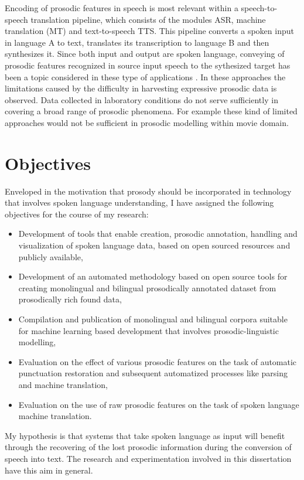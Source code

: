 Encoding of prosodic features in speech is most relevant within a speech-to-speech translation pipeline, which consists of the modules ASR, machine translation (MT) and text-to-speech TTS. This pipeline converts a spoken input in language A to text, translates its transcription to language B and then synthesizes it. Since both input and output are spoken language, conveying of prosodic features recognized in source input speech to the sythesized target has been a topic considered in these type of applications \citep{aguero2006prosody, Quoc2018}. In these approaches the limitations caused by the difficulty in harvesting expressive prosodic data is observed. Data collected in laboratory conditions do not serve sufficiently in covering a broad range of prosodic phenomena. For example these kind of limited approaches would not be sufficient in prosodic modelling within movie domain. 

\section{Objectives}
Enveloped in the motivation that prosody should be incorporated in technology that involves spoken language understanding, I have assigned the following objectives for the course of my research:

\begin{itemize}
    \item Development of tools that enable creation, prosodic annotation, handling and visualization of spoken language data, based on open sourced resources and publicly available,
    \item Development of an automated methodology based on open source tools for creating monolingual and bilingual prosodically annotated dataset from prosodically rich found data,
    \item Compilation and publication of monolingual and bilingual corpora suitable for machine learning based development that involves prosodic-linguistic modelling,
    \item Evaluation on the effect of various prosodic features on the task of automatic punctuation restoration and subsequent automatized processes like parsing and machine translation,
    \item Evaluation on the use of raw prosodic features on the task of spoken language machine translation. 
\end{itemize}

My hypothesis is that systems that take spoken language as input will benefit through the recovering of the lost prosodic information during the conversion of speech into text. The research and experimentation involved in this dissertation have this aim in general. 

